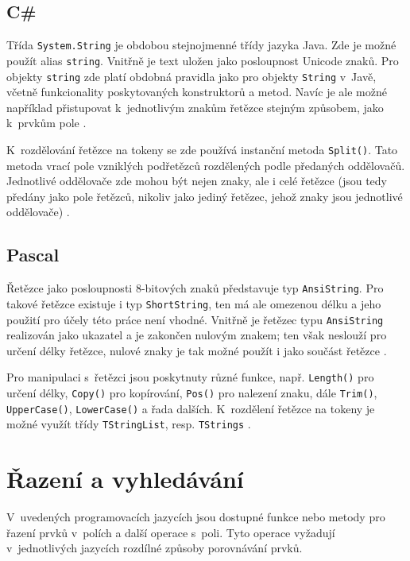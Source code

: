 \documentclass[czech,BP]{thesiskiv}
\begin{document}
\subsection{C\#}
Třída \texttt{System.String} je obdobou stejnojmenné třídy jazyka Java. Zde je možné použít alias \texttt{string}. Vnitřně je text uložen jako posloupnost Unicode znaků. Pro objekty \texttt{string} zde platí obdobná pravidla jako pro objekty \texttt{String} v~Javě, včetně funkcionality poskytovaných konstruktorů a metod. Navíc je ale možné například přistupovat k~jednotlivým znakům řetězce stejným způsobem, jako k~prvkům pole \cite{cs-guide-stringclass}.\par
K~rozdělování řetězce na tokeny se zde používá instanční metoda \texttt{Split()}. Tato metoda vrací pole vzniklých podřetězců rozdělených podle předaných oddělovačů. Jednotlivé oddělovače zde mohou být nejen znaky, ale i celé řetězce (jsou tedy předány jako pole řetězců, nikoliv jako jediný řetězec, jehož znaky jsou jednotlivé oddělovače) \cite{cs-guide-stringsplit}.

\subsection{Pascal}
Řetězce jako posloupnosti 8-bitových znaků představuje typ \texttt{AnsiString}. Pro takové řetězce existuje i typ \texttt{ShortString}, ten má ale omezenou délku a jeho použití pro účely této práce není vhodné. Vnitřně je řetězec typu \texttt{AnsiString} realizován jako ukazatel a je zakončen nulovým znakem; ten však neslouží pro určení délky řetězce, nulové znaky je tak možné použít i jako součást řetězce \cite{pas-guide-strings, pas-guide-shortstring, pas-guide-ansistring}.\par
Pro manipulaci s~řetězci jsou poskytnuty různé funkce, např. \texttt{Length()} pro určení délky, \texttt{Copy()} pro kopírování, \texttt{Pos()} pro nalezení znaku, dále \texttt{Trim()}, \texttt{UpperCase()}, \texttt{LowerCase()} a řada dalších. K~rozdělení řetězce na tokeny je možné využít třídy \texttt{TStringList}, resp. \texttt{TStrings} \cite{pas-guide-system, pas-guide-tstringlist, pas-guide-tstrings}.

\section{Řazení a vyhledávání}\label{sec:sorting}
V~uvedených programovacích jazycích jsou dostupné funkce nebo metody pro řazení prvků v~polích a další operace s~poli. Tyto operace vyžadují v~jednotlivých jazycích rozdílné způsoby porovnávání prvků.
\end{document}
